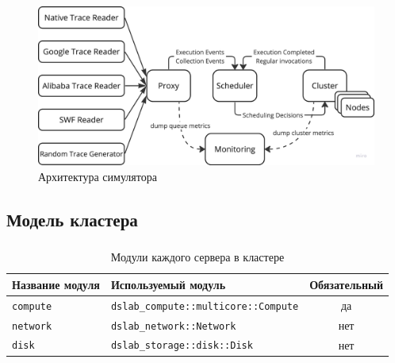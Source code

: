 \documentclass[t]{beamer}  %
\begin{document}
	\begin{frame}[fragile]
		\frametitle{\insertsection} 
		\framesubtitle{\insertsubsection}
		
		\vspace{0.5cm}
\begin{figure}[H]
	\includegraphics[width=\linewidth]{images/simulator_arc}
	\vspace{0.2cm}
	\caption*{Архитектура симулятора}
\end{figure}

	\end{frame}


	\subsection{Модель кластера}

	\begin{frame}[fragile]
		\frametitle{\insertsection} 
		\framesubtitle{\insertsubsection}


		\vspace{1.5cm}
\begin{table}[H]
	\footnotesize
    \centering
    \begin{tabular}{|l|l|c|}
    \hline
    \textbf{Название модуля} & \textbf{Используемый модуль} & \textbf{Обязательный} \\
    \hline
    \texttt{compute} & \texttt{dslab\_compute::multicore::Compute} & да \\
    \hline
    \texttt{network} & \texttt{dslab\_network::Network} & нет  \\
    \hline
    \texttt{disk} & \texttt{dslab\_storage::disk::Disk} & нет \\
    \hline
    \end{tabular}
    \caption*{Модули каждого сервера в кластере}
    \label{tab:server_modules}
\end{table}
\end{frame}
\end{document}
